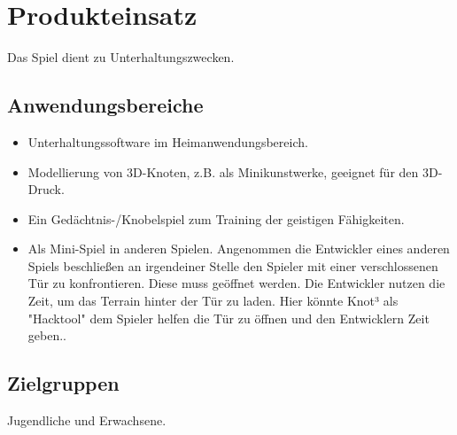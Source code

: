 \chapter{Produkteinsatz}

Das Spiel dient zu Unterhaltungszwecken.

\section{Anwendungsbereiche}


\begin{itemize}

	\item Unterhaltungssoftware im Heimanwendungsbereich. 
	
	\item Modellierung von 3D-Knoten,
	z.B. als Minikunstwerke, geeignet für den 3D-Druck.
	
	\item Ein Gedächtnis-/Knobelspiel zum Training der
	geistigen Fähigkeiten.
	
	\item Als Mini-Spiel in anderen Spielen. Angenommen die Entwickler eines anderen Spiels beschließen
	an irgendeiner  Stelle den Spieler mit einer verschlossenen Tür zu konfrontieren. Diese muss
	geöffnet werden. Die Entwickler nutzen die Zeit, um das Terrain hinter der Tür zu laden. Hier könnte
	Knot³ als "Hacktool" dem Spieler helfen die Tür zu öffnen und den Entwicklern Zeit geben..
	
	
\end{itemize}

\section{Zielgruppen}

Jugendliche und Erwachsene.




